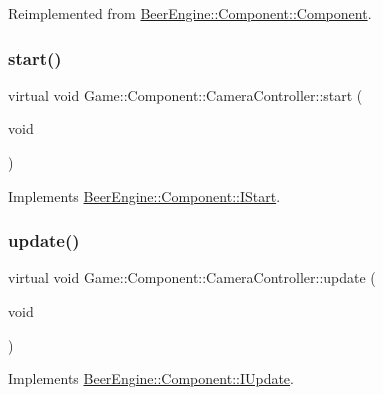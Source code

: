 Reimplemented from \mbox{\hyperlink{class_beer_engine_1_1_component_1_1_component_a4d82d8a6b22b93514e0585fa4073041f}{Beer\+Engine\+::\+Component\+::\+Component}}.

\mbox{\label{class_game_1_1_component_1_1_camera_controller_afe64421588babbf921d77756fa38a48b}} 
\subsubsection{\texorpdfstring{start()}{start()}}
{\footnotesize\ttfamily virtual void Game\+::\+Component\+::\+Camera\+Controller\+::start (\begin{DoxyParamCaption}\item[{void}]{ }\end{DoxyParamCaption})\hspace{0.3cm}{\ttfamily [virtual]}}



Implements \mbox{\hyperlink{class_beer_engine_1_1_component_1_1_i_start_aa3e25e86e20c46cdaefc6f6d7f21e495}{Beer\+Engine\+::\+Component\+::\+I\+Start}}.

\mbox{\label{class_game_1_1_component_1_1_camera_controller_a675655ee2e18382203f1afa2329a1739}} 
\subsubsection{\texorpdfstring{update()}{update()}}
{\footnotesize\ttfamily virtual void Game\+::\+Component\+::\+Camera\+Controller\+::update (\begin{DoxyParamCaption}\item[{void}]{ }\end{DoxyParamCaption})\hspace{0.3cm}{\ttfamily [virtual]}}



Implements \mbox{\hyperlink{class_beer_engine_1_1_component_1_1_i_update_aeeda0aa303175720e449b4c51d9867dd}{Beer\+Engine\+::\+Component\+::\+I\+Update}}.



